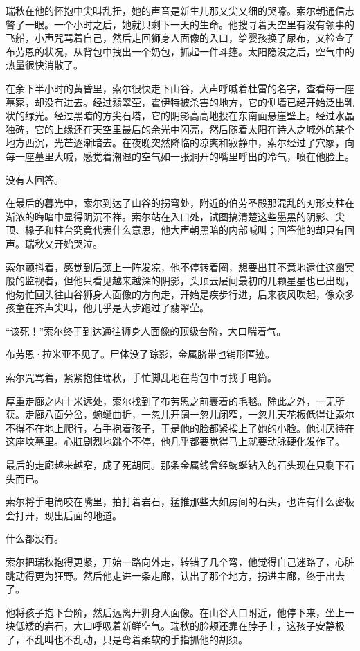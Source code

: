 \documentclass[AutoFakeBold=true]{book}
\begin{document}
瑞秋在他的怀抱中尖叫乱扭，她的声音是新生儿那又尖又细的哭嚎。索尔朝通信志瞥了一眼。一个小时之后，她就只剩下一天的生命。他搜寻着天空里有没有领事的飞船，小声咒骂着自己，然后走回狮身人面像的入口，给婴孩换了尿布，又检查了布劳恩的状况，从背包中拽出一个奶包，抓起一件斗篷。太阳隐没之后，空气中的热量很快消散了。

在余下半小时的黄昏里，索尔很快走下山谷，大声呼喊着杜雷的名字，查看每一座墓冢，却没有进去。经过翡翠茔，霍伊特被杀害的地方，它的侧墙已经开始泛出乳状的绿光。经过黑暗的方尖石塔，它的阴影高高地投在东南面悬崖壁上。经过水晶独碑，它的上缘还在天空里最后的余光中闪亮，然后随着太阳在诗人之城外的某个地方西沉，光芒逐渐暗去。在夜晚突然降临的凉爽和寂静中，索尔经过了穴冢，向每一座墓里大喊，感觉着潮湿的空气如一张洞开的嘴里呼出的冷气，喷在他脸上。

没有人回答。

在最后的暮光中，索尔到达了山谷的拐弯处，附近的伯劳圣殿那混乱的刃形支柱在渐浓的晦暗中显得阴沉不祥。索尔站在入口处，试图搞清楚这些墨黑的阴影、尖顶、椽子和柱台究竟代表什么意思，他大声朝黑暗的内部喊叫；回答他的却只有回声。瑞秋又开始哭泣。

索尔颤抖着，感觉到后颈上一阵发凉，他不停转着圈，想要出其不意地逮住这幽冥般的监视者，但他只看见越来越深的阴影，头顶云层间最初的几颗星星也已出现，他匆忙回头往山谷狮身人面像的方向走，开始是疾步行进，后来夜风吹起，像众多孩童在齐声尖叫，他几乎是大步跑过了翡翠茔。

``{\kaishu 该死！}''索尔终于到达通往狮身人面像的顶级台阶，大口喘着气。

布劳恩·拉米亚不见了。尸体没了踪影，金属脐带也销形匿迹。

索尔咒骂着，紧紧抱住瑞秋，手忙脚乱地在背包中寻找手电筒。

厚重走廊之内十米远处，索尔找到了布劳恩之前裹着的毛毯。除此之外，一无所获。走廊八面分岔，蜿蜒曲折，一忽儿开阔一忽儿闭窄，一忽儿天花板低得让索尔不得不在地上爬行，右手抱着孩子，于是他的脸都紧挨上了她的小脸。他讨厌待在这座坟墓里。心脏剧烈地跳个不停，他几乎都要觉得马上就要动脉硬化发作了。

最后的走廊越来越窄，成了死胡同。那条金属线曾经蜿蜒钻入的石头现在只剩下石头而已。

索尔将手电筒咬在嘴里，拍打着岩石，猛推那些大如房间的石头，也许有什么密板会打开，现出后面的地道。

什么都没有。

索尔把瑞秋抱得更紧，开始一路向外走，转错了几个弯，他觉得自己迷路了，心脏跳动得更为狂野。然后他走进一条走廊，认出了那个地方，拐进主廊，终于出去了。

他将孩子抱下台阶，然后远离开狮身人面像。在山谷入口附近，他停下来，坐上一块低矮的岩石，大口呼吸着新鲜空气。瑞秋的脸颊还靠在脖子上，这孩子安静极了，不乱叫也不乱动，只是弯着柔软的手指抓他的胡须。
\end{document}
